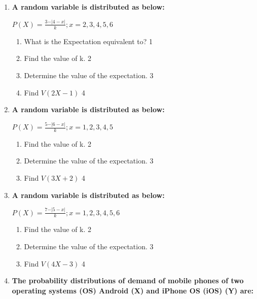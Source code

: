 \documentclass[a4paper,oneside, margin=1.4in]{book}
\begin{document}
\begin{enumerate}
        \item \textbf{A random variable is distributed as below:}
        
        \begin{center}
  $\displaystyle P(X) = \frac{3-\vert 4-x\vert}{k}; x=2,3,4,5,6$
  \end{center}

  \begin{enumerate}
    \item
	What is the Expectation equivalent to? \hfill 1
    \item
    	Find the value of k. \hfill 2
    \item
    	Determine the value of the expectation. \hfill 3
     \item
     	Find $V(2X-1)$ \hfill 4
  \end{enumerate}
  
  \item \textbf{A random variable is distributed as below:}

\begin{center}
  \textbf{$P(X) = \frac{5-\vert 6-x\vert}{k}; x=1,2,3,4,5$}
\end{center}

\begin{enumerate}
  \item
  	Find the value of k. \hfill 2
  \item
  	Determine the value of the expectation. \hfill 3
  \item
  	Find $V(3X+2)$ \hfill 4
\end{enumerate}

\item \textbf{A random variable is distributed as below:}

\begin{center}
  \textbf{$P(X) = \frac{7-\vert 5-x\vert}{k}; x=1,2,3,4,5,6$}
\end{center}

\begin{enumerate}
  \item
  	Find the value of k. \hfill 2
  \item
  	Determine the value of the expectation. \hfill 3
  \item
  	Find $V(4X-3)$ \hfill 4
\end{enumerate}

  
   \item
	  \textbf{The probability distributions of demand of mobile phones of two 
	  operating systems (OS) Android (X) and iPhone OS (iOS) (Y) are:} 
	  

\end{enumerate}
\end{document}
